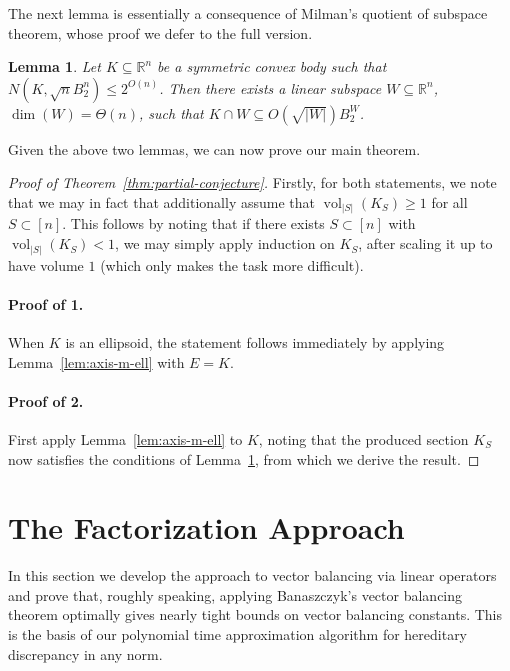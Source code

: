 \documentclass[11pt]{article}
\newtheorem{lemma}[theorem]{Lemma}
\newcommand{\R}{{\mathbb{R}}}
\DeclareMathOperator{\vol}{vol}
\begin{document}
The next lemma is essentially a consequence of Milman's quotient of subspace
theorem, whose proof we defer to the full version.

\begin{lemma}
\label{lem:cover-to-section}
Let $K \subseteq \R^n$ be a symmetric convex body such that $N(K,\sqrt{n}B_2^n)
\leq 2^{O(n)}$. Then there exists a linear subspace $W \subseteq \R^n$, $\dim(W) =
\Theta(n)$, such that $K \cap W \subseteq O(\sqrt{|W|}) B_2^W$.  
\end{lemma}

Given the above two lemmas, we can now prove our main theorem.

\begin{proof}[Proof of Theorem~\ref{thm:partial-conjecture}]
Firstly, for both statements, we note that we may in fact that additionally
assume that $\vol_{|S|}(K_S) \geq 1$ for all $S \subset [n]$. This follows by
noting that if there exists $S \subset [n]$ with $\vol_{|S|}(K_S) < 1$, we may
simply apply induction on $K_S$, after scaling it up to have volume $1$ (which
only makes the task more difficult). 

\paragraph{\bf Proof of 1.} When $K$ is an ellipsoid, the statement follows
immediately by applying Lemma~\ref{lem:axis-m-ell} with $E=K$. 

\paragraph{\bf Proof of 2.} First apply Lemma~\ref{lem:axis-m-ell} to $K$,
noting that the produced section $K_S$ now satisfies the conditions of
Lemma~\ref{lem:cover-to-section}, from which we derive the result.  
\end{proof}

\section{The Factorization Approach}
\label{sec:factorization}

In this section we develop the approach to vector balancing via linear
operators and prove that, roughly speaking, applying Banaszczyk's
vector balancing theorem optimally gives nearly tight bounds on vector
balancing constants. This  is the basis of our polynomial time
approximation algorithm for hereditary discrepancy in any norm.
\end{document}
